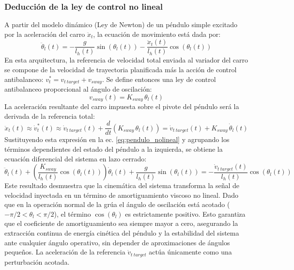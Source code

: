 \subsubsection{Deducción de la ley de control no lineal}
A partir del modelo dinámico (Ley de Newton) de un péndulo simple excitado por la aceleración del carro $\ddot{x}_t$, la ecuación de movimiento está dada por:
\begin{equation}
    \ddot{\theta}_l(t) = -\frac{g}{l_h(t)}\sin(\theta_l(t)) - \frac{\ddot{x}_t(t)}{l_h(t)}\cos(\theta_l(t))
    \label{eq:pendulo_nolineal}
\end{equation}
En esta arquitectura, la referencia de velocidad total enviada al variador del carro se compone de la velocidad de trayectoria planificada más la acción de control antibalanceo: $v_t^\ast = v_{t\ target} + v_{sway}$. 
Se define entonces una ley de control antibalanceo proporcional al ángulo de oscilación:
\begin{equation}
    v_{sway}(t) = K_{sway} \, \theta_l(t)
    \label{eq:ley_control}
\end{equation}
La aceleración resultante del carro impuesta sobre el pivote del péndulo será la derivada de la referencia total:
\begin{equation}
    \ddot{x}_t(t) \approx \dot{v}_t^\ast(t) \approx \dot{v}_{t\ target}(t) + \frac{d}{dt}(K_{sway} \, \theta_l(t)) = \dot{v}_{t\ target}(t) + K_{sway} \, \dot{\theta}_l(t)
\end{equation}
Sustituyendo esta expresión en la ec. \ref{eq:pendulo_nolineal} y agrupando los términos dependientes del estado del péndulo a la izquierda, se obtiene la ecuación diferencial del sistema en lazo cerrado:
\begin{equation}
    \ddot{\theta}_l(t) + \left( \frac{K_{sway}}{l_h(t)} \cos(\theta_l(t)) \right) \dot{\theta}_l(t) + \frac{g}{l_h(t)}\sin(\theta_l(t)) = -\frac{\dot{v}_{t\ target}(t)}{l_h(t)}\cos(\theta_l(t))
    \label{eq:lazo_cerrado_nolineal}
\end{equation}
Este resultado desmuestra que la cinemática del sistema transforma la señal de velocidad inyectada en un término de amortiguamiento 
viscoso no lineal. Dado que en la operación normal de la grúa el ángulo de oscilación está acotado ($-\pi/2 < \theta_l < \pi/2$), 
el término $\cos(\theta_l)$ es estrictamente positivo. Esto garantiza que el coeficiente de amortiguamiento sea siempre mayor a cero, 
asegurando la extracción continua de energía cinética del péndulo y la estabilidad del sistema ante cualquier ángulo operativo, 
sin depender de aproximaciones de ángulos pequeños. La aceleración de la referencia $\dot{v}_{t\ target}$ actúa únicamente como una 
perturbación acotada.

